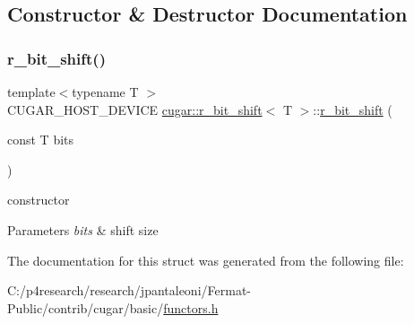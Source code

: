 \subsection{Constructor \& Destructor Documentation}
\mbox{\label{structcugar_1_1r__bit__shift_a6586c9c3e3c80eafcfae7ddedca55075}} 
\subsubsection{\texorpdfstring{r\+\_\+bit\+\_\+shift()}{r\_bit\_shift()}}
{\footnotesize\ttfamily template$<$typename T $>$ \\
C\+U\+G\+A\+R\+\_\+\+H\+O\+S\+T\+\_\+\+D\+E\+V\+I\+CE \hyperlink{structcugar_1_1r__bit__shift}{cugar\+::r\+\_\+bit\+\_\+shift}$<$ T $>$\+::\hyperlink{structcugar_1_1r__bit__shift}{r\+\_\+bit\+\_\+shift} (\begin{DoxyParamCaption}\item[{const T}]{bits }\end{DoxyParamCaption})\hspace{0.3cm}{\ttfamily [inline]}}

constructor


\begin{DoxyParams}{Parameters}
{\em bits} & shift size \\
\hline
\end{DoxyParams}


The documentation for this struct was generated from the following file\+:\begin{DoxyCompactItemize}
\item 
C\+:/p4research/research/jpantaleoni/\+Fermat-\/\+Public/contrib/cugar/basic/\hyperlink{functors_8h}{functors.\+h}\end{DoxyCompactItemize}
